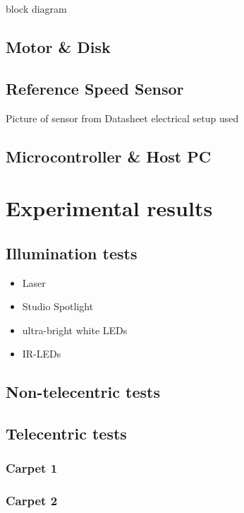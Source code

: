 \documentclass[12pt,a4paper]{article}
\begin{document}
block diagram

\subsection{Motor \& Disk}

\subsection{Reference Speed Sensor}
      Picture of sensor from Datasheet
      electrical setup used

\subsection{Microcontroller \& Host PC}      

\section{Experimental results}

\subsection{Illumination tests}

\begin{itemize}
  \item Laser
  \item Studio Spotlight
  \item ultra-bright white LEDs
  \item IR-LEDs
\end{itemize}

\subsection{Non-telecentric tests}

\subsection{Telecentric tests}

\subsubsection{Carpet 1}

\subsubsection{Carpet 2}
\end{document}
